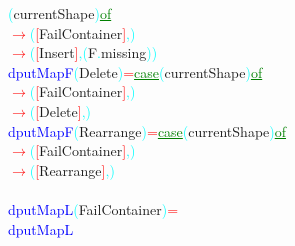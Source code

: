 \textcolor{cyan}{(}{\rm{}currentShape}\textcolor{cyan}{)}\hsspace \textcolor{green}{\underline{of}}\\\hsspace \textcolor{red}{\ensuremath{\rightarrow}}\hsspace \textcolor{cyan}{(}\textcolor{red}{[}{\rm{}FailContainer}\textcolor{red}{]}\textcolor{cyan}{,}\textcolor{cyan}{)}\\\hsspace \hsspace \textcolor{red}{\ensuremath{\rightarrow}}\hsspace \textcolor{cyan}{(}\textcolor{red}{[}{\rm{}Insert}\textcolor{red}{]}\textcolor{cyan}{,}\hsspace \textcolor{cyan}{(}{\rm{}F}\textcolor{cyan}{.}{\rm{}missing}\textcolor{cyan}{)}\textcolor{cyan}{)}\\\textcolor{blue}{dputMapF}\hsspace \textcolor{cyan}{(}{\rm{}Delete}\textcolor{cyan}{)}\hsspace \textcolor{red}{=}\hsspace \textcolor{green}{\underline{case}}\hsspace \textcolor{cyan}{(}{\rm{}currentShape}\textcolor{cyan}{)}\hsspace \textcolor{green}{\underline{of}}\\\hsspace \textcolor{red}{\ensuremath{\rightarrow}}\hsspace \textcolor{cyan}{(}\textcolor{red}{[}{\rm{}FailContainer}\textcolor{red}{]}\textcolor{cyan}{,}\textcolor{cyan}{)}\\\hsspace \hsspace \textcolor{red}{\ensuremath{\rightarrow}}\hsspace \textcolor{cyan}{(}\textcolor{red}{[}{\rm{}Delete}\textcolor{red}{]}\textcolor{cyan}{,}\textcolor{cyan}{)}\\\textcolor{blue}{dputMapF}\hsspace \textcolor{cyan}{(}{\rm{}Rearrange}\textcolor{cyan}{)}\hsspace \textcolor{red}{=}\hsspace \textcolor{green}{\underline{case}}\hsspace \textcolor{cyan}{(}{\rm{}currentShape}\textcolor{cyan}{)}\hsspace \textcolor{green}{\underline{of}}\\\hsspace \textcolor{red}{\ensuremath{\rightarrow}}\hsspace \textcolor{cyan}{(}\textcolor{red}{[}{\rm{}FailContainer}\textcolor{red}{]}\textcolor{cyan}{,}\textcolor{cyan}{)}\\\hsspace \hsspace \textcolor{red}{\ensuremath{\rightarrow}}\hsspace \textcolor{cyan}{(}\textcolor{red}{[}{\rm{}Rearrange}\textcolor{red}{]}\textcolor{cyan}{,}\textcolor{cyan}{)}\\\\\textcolor{blue}{dputMapL}\hsspace \textcolor{cyan}{(}{\rm{}FailContainer}\hsspace \textcolor{cyan}{)}\hsspace \textcolor{red}{=}\\\textcolor{blue}{dputMapL}\hsspace 